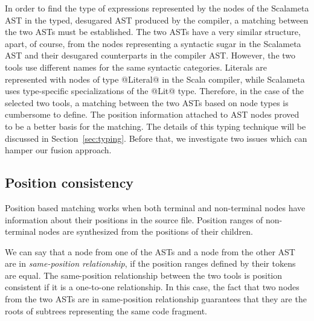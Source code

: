\documentclass[11pt]{amsart}
\begin{document}
In order to find the type of expressions represented by the nodes of the
Scalameta AST in the typed, desugared AST produced by the compiler, a matching
between the two ASTs must be established.
The two ASTs have a very similar structure, apart, of course, from the nodes
representing a syntactic sugar in the Scalameta AST and their desugared
counterparts in the compiler AST. However, the two tools use different names for
the same syntactic categories. Literals are represented with nodes of type @Literal@
in the Scala compiler, while Scalameta uses type-specific specializations of the
@Lit@ type. Therefore, in the case of the selected two tools, a matching between
the two ASTs based on node types is cumbersome to define. %
The position information attached to AST nodes proved to be a better basis
for the matching. The details of this typing technique will be discussed in
Section~\ref{sec:typing}. Before that, we investigate two issues which can hamper
our fusion approach.

%
%

\subsection{Position consistency}

Position based matching works when both terminal and non-terminal nodes have
information about their positions in the source file. Position ranges
of non-terminal nodes are synthesized from the positions of their
children. 

We can say that a node from one of the ASTs and a node from the other AST are
in \emph{same-position relationship}, if the position ranges defined by their
tokens are equal. The same-position relationship between the two tools is
position consistent if it
is a one-to-one relationship. In this case, the fact that two nodes from the
two ASTs are in same-position relationship guarantees that they are the
roots of subtrees representing the same code fragment.
\end{document}
